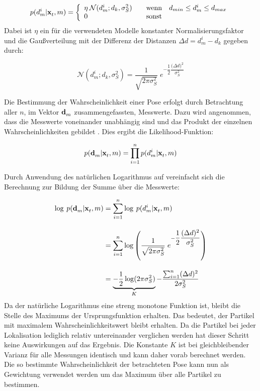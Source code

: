 \begin{equation}
p(d_m^i|\mathbf{x}^{}_{t},m) = \left\lbrace\begin{array}{ll}
\eta \: \mathcal{N}(d_m^i;d_k,\sigma_S^2) & \quad \mathrm{wenn} \quad d_{min}\leq d_m^i \leq d_{max} \\
0 & \quad \mathrm{sonst}
\end{array}
\right.
\end{equation}
Dabei ist $\eta$ ein für die verwendeten Modelle konstanter Normalisierungsfaktor und die Gaußverteilung mit der Differenz der Distanzen $\Delta d = d_m^i-d_k$  gegeben durch:

\begin{equation}
\mathcal{N}(d_m^i;d_k,\sigma_S^2) = \frac{1}{\sqrt{2\pi\sigma_S^2}} \; e^{-\dfrac{1}{2}\dfrac{{(\Delta d})^2}{\sigma_S^2}}
\end{equation}

Die Bestimmung der Wahrscheinlichkeit einer Pose erfolgt durch Betrachtung aller $n$, im Vektor $\mathbf{d}^{}_{m}$ zusammengefassten, Messwerte. Dazu wird angenommen, dass die Messwerte voneinander unabhängig sind und das Produkt der einzelnen Wahrscheinlichkeiten gebildet \cite{Hornung2010}. Dies ergibt die Likelihood-Funktion:

\begin{equation}
\label{eq.likelihood}
p(\mathbf{d}^{}_{m}|\mathbf{x}^{}_{t},m) = \prod_{i=1}^{n}p(d_m^i|\mathbf{x}^{}_{t},m)
\end{equation}

Durch Anwendung des natürlichen Logarithmus auf  vereinfacht sich die Berechnung zur Bildung der Summe über die Messwerte:

\begin{equation}
\begin{split}
\log \: p(\mathbf{d}^{}_{m}|\mathbf{x}^{}_{t},m) & = \sum_{i=1}^{n}\log\: p(d_m^i|\mathbf{x}^{}_{t},m) \\[1em]
& = \sum_{i=1}^{n}\log \left( \frac{1}{\sqrt{2\pi\sigma_S^2}} \; e^{-\dfrac{1}{2}\dfrac{{(\Delta d})^2}{\sigma_S^2}} \right)\\[1em]
& = \underbrace{-\frac{1}{2}\log(2\pi\sigma_S^2)}_K-\dfrac{\sum_{i=1}^{n}(\Delta d)^2}{2\sigma_S^2}
\end{split}
\end{equation}
Da der natürliche Logarithmus eine streng monotone Funktion ist, bleibt die Stelle des Maximums der Ursprungsfunktion erhalten. Das bedeutet, der Partikel mit maximalem Wahrscheinlichkeitswert bleibt erhalten. Da die Partikel bei jeder Lokalisation lediglich relativ untereinander verglichen werden hat dieser Schritt keine Auswirkungen auf das Ergebnis. Die Konstante $K$ ist bei gleichbleibender Varianz für alle Messungen identisch und kann daher vorab berechnet werden.\\
Die so bestimmte Wahrscheinlichkeit der betrachteten Pose kann nun als Gewichtung verwendet werden um das Maximum über alle Partikel zu bestimmen. 

